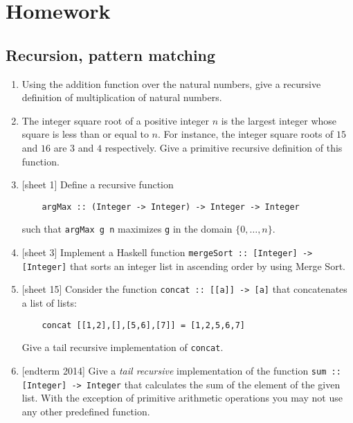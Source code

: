 \documentclass{article}
\begin{document}
\section{Homework}

\subsection{Recursion, pattern matching}
\begin{enumerate}
\item \cite[p. 86]{thompson} Using the addition function over the natural numbers, give a recursive definition of multiplication of natural numbers.

\item \cite[p. 86]{thompson} The integer square root of a positive integer $n$ is the largest integer whose square is less than or equal to $n$. For instance, the integer square roots of $15$ and $16$ are $3$ and $4$ respectively. Give a primitive recursive definition of this function.

\item {[sheet 1]} Define a recursive function
\begin{verbatim}
    argMax :: (Integer -> Integer) -> Integer -> Integer
\end{verbatim}
such that \verb|argMax g n| maximizes \verb|g| in the domain $\{0,\dots,n\}$.

\item {[sheet 3]} Implement a Haskell function \verb|mergeSort :: [Integer] -> [Integer]| that sorts an integer list in ascending order by using Merge Sort.

\item {[sheet 15]} Consider the function \verb|concat :: [[a]] -> [a]| that concatenates a list of lists:
\begin{verbatim}
    concat [[1,2],[],[5,6],[7]] = [1,2,5,6,7]
\end{verbatim}
Give a tail recursive implementation of \verb|concat|.

\item {[endterm 2014]} Give a \textit{tail recursive} implementation of the function \verb|sum :: [Integer] -> Integer| that calculates the sum of the element of the given list. With the exception of primitive arithmetic operations you may not use any other predefined function.
\end{enumerate}
\end{document}
